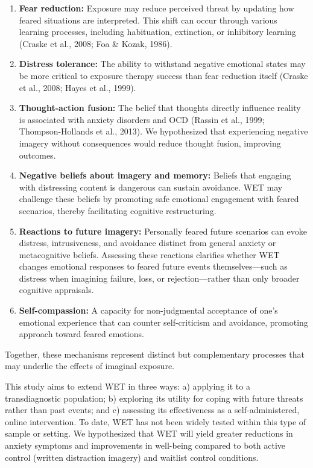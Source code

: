 \documentclass[
  man,floatsintext]{apa7}
\providecommand{\tightlist}{%
  \setlength{\itemsep}{0pt}\setlength{\parskip}{0pt}}
\begin{document}
\begin{enumerate}
\def\labelenumi{\arabic{enumi}.}
\tightlist
\item
  \textbf{Fear reduction:} Exposure may reduce perceived threat by updating how feared situations are interpreted. This shift can occur through various learning processes, including habituation, extinction, or inhibitory learning (Craske et al., 2008; Foa \& Kozak, 1986).
\item
  \textbf{Distress tolerance:} The ability to withstand negative emotional states may be more critical to exposure therapy success than fear reduction itself (Craske et al., 2008; Hayes et al., 1999).
\item
  \textbf{Thought-action fusion:} The belief that thoughts directly influence reality is associated with anxiety disorders and OCD (Rassin et al., 1999; Thompson-Hollands et al., 2013). We hypothesized that experiencing negative imagery without consequences would reduce thought fusion, improving outcomes.
\item
  \textbf{Negative beliefs about imagery and memory:} Beliefs that engaging with distressing content is dangerous can sustain avoidance. WET may challenge these beliefs by promoting safe emotional engagement with feared scenarios, thereby facilitating cognitive restructuring.
\item
  \textbf{Reactions to future imagery:} Personally feared future scenarios can evoke distress, intrusiveness, and avoidance distinct from general anxiety or metacognitive beliefs. Assessing these reactions clarifies whether WET changes emotional responses to feared future events themselves---such as distress when imagining failure, loss, or rejection---rather than only broader cognitive appraisals.
\item
  \textbf{Self-compassion:} A capacity for non-judgmental acceptance of one's emotional experience that can counter self-criticism and avoidance, promoting approach toward feared emotions.
\end{enumerate}

Together, these mechanisms represent distinct but complementary processes that may underlie the effects of imaginal exposure.

This study aims to extend WET in three ways: a) applying it to a transdiagnostic population; b) exploring its utility for coping with future threats rather than past events; and c) assessing its effectiveness as a self-administered, online intervention.
To date, WET has not been widely tested within this type of sample or setting.
We hypothesized that WET will yield greater reductions in anxiety symptoms and improvements in well-being compared to both active control (written distraction imagery) and waitlist control conditions.
\end{document}
